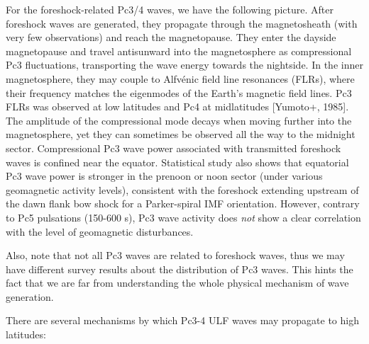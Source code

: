 \documentclass[
  notoc %
]{tufte-book}
\begin{document}
For the foreshock-related Pc3/4 waves, we have the following picture.
After foreshock waves are generated, they propagate through the
magnetosheath (with very few observations) and reach the magnetopause.
They enter the dayside magnetopause and travel antisunward into the
magnetosphere as compressional Pc3 fluctuations, transporting the wave
energy towards the nightside. In the inner magnetosphere, they may
couple to Alfvénic field line resonances (FLRs), where their frequency
matches the eigenmodes of the Earth's magnetic field lines. Pc3 FLRs was
observed at low latitudes and Pc4 at midlatitudes {[}Yumoto+, 1985{]}.
The amplitude of the compressional mode decays when moving further into
the magnetosphere, yet they can sometimes be observed all the way to the
midnight sector. Compressional Pc3 wave power associated with
transmitted foreshock waves is confined near the equator. Statistical
study also shows that equatorial Pc3 wave power is stronger in the
prenoon or noon sector (under various geomagnetic activity levels),
consistent with the foreshock extending upstream of the dawn flank bow
shock for a Parker-spiral IMF orientation. However, contrary to Pc5
pulsations (150-600 s), Pc3 wave activity does \emph{not} show a clear
correlation with the level of geomagnetic disturbances.

Also, note that not all Pc3 waves are related to foreshock waves, thus
we may have different survey results about the distribution of Pc3
waves. This hints the fact that we are far from understanding the whole
physical mechanism of wave generation.

There are several mechanisms by which Pc3-4 ULF waves may propagate to
high latitudes:
\end{document}
